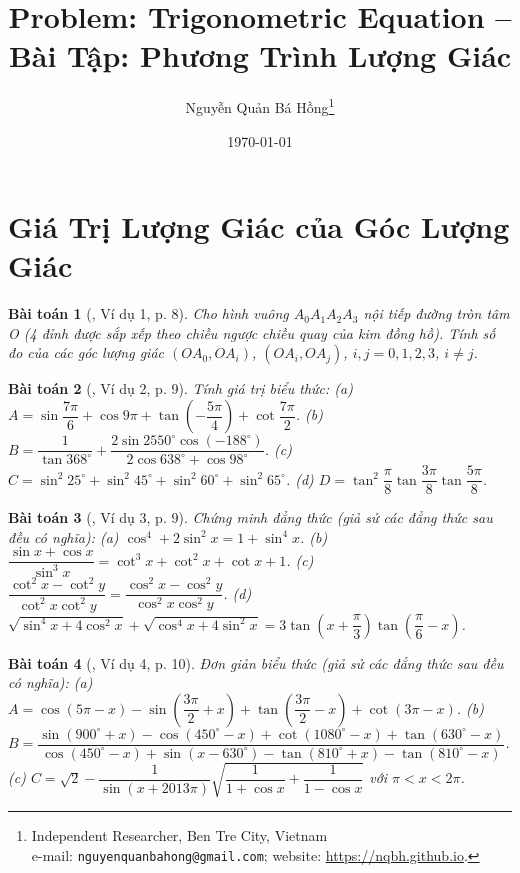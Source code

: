 \documentclass{article}
\title{Problem: Trigonometric Equation -- Bài Tập: Phương Trình Lượng Giác}
\author{Nguyễn Quản Bá Hồng\footnote{Independent Researcher, Ben Tre City, Vietnam\\e-mail: \texttt{nguyenquanbahong@gmail.com}; website: \url{https://nqbh.github.io}.}}
\date{\today}
\newtheorem{baitoan}{Bài toán}
\begin{document}
\maketitle
\tableofcontents


\section{Giá Trị Lượng Giác của Góc Lượng Giác}

\begin{baitoan}[\cite{Hung_nang_cao_phat_trien_Toan_11_tap_1}, Ví dụ 1, p. 8]
	Cho hình vuông $A_0A_1A_2A_3$ nội tiếp đường  tròn tâm O (4 đỉnh được sắp xếp theo chiều ngược chiều quay của kim đồng hồ). Tính số đo của các góc lượng giác $(OA_0,OA_i)$, $(OA_i,OA_j)$, $i,j = 0,1,2,3$, $i\ne j$.
\end{baitoan}

\begin{baitoan}[\cite{Hung_nang_cao_phat_trien_Toan_11_tap_1}, Ví dụ 2, p. 9]
	Tính giá trị biểu thức: (a) $A = \sin\dfrac{7\pi}{6} + \cos9\pi + \tan\left(-\dfrac{5\pi}{4}\right) + \cot\dfrac{7\pi}{2}$. (b) $B = \dfrac{1}{\tan368^\circ} + \dfrac{2\sin2550^\circ\cos(-188^\circ)}{2\cos638^\circ + \cos98^\circ}$. (c) $C = \sin^2 25^\circ + \sin^2 45^\circ + \sin^2 60^\circ + \sin^2 65^\circ$. (d) $D = \tan^2\dfrac{\pi}{8}\tan\dfrac{3\pi}{8}\tan\dfrac{5\pi}{8}$.
\end{baitoan}

\begin{baitoan}[\cite{Hung_nang_cao_phat_trien_Toan_11_tap_1}, Ví dụ 3, p. 9]
	Chứng minh đẳng thức (giả sử các đẳng thức sau đều có nghĩa): (a) $\cos^4 + 2\sin^2x = 1 + \sin^4x$. (b) $\dfrac{\sin x + \cos x}{\sin^3x} = \cot^3x + \cot^2x + \cot x + 1$. (c) $\dfrac{\cot^2x - \cot^2y}{\cot^2x\cot^2y} = \dfrac{\cos^2x - \cos^2y}{\cos^2x\cos^2y}$. (d) $\sqrt{\sin^4x + 4\cos^2x} + \sqrt{\cos^4x + 4\sin^2x} = 3\tan\left(x + \dfrac{\pi}{3}\right)\tan\left(\dfrac{\pi}{6} - x\right)$.
\end{baitoan}

\begin{baitoan}[\cite{Hung_nang_cao_phat_trien_Toan_11_tap_1}, Ví dụ 4, p. 10]
	Đơn giản biểu thức (giả sử các đẳng thức sau đều có nghĩa): (a) $A = \cos(5\pi - x) - \sin\left(\dfrac{3\pi}{2} + x\right) + \tan\left(\dfrac{3\pi}{2} - x\right) + \cot(3\pi - x)$. (b) $B = \dfrac{\sin(900^\circ + x) - \cos(450^\circ - x) + \cot(1080^\circ - x) + \tan(630^\circ - x)}{\cos(450^\circ - x) + \sin(x - 630^\circ) - \tan(810^\circ + x) - \tan(810^\circ - x)}$. (c) $C = \sqrt{2} - \dfrac{1}{\sin(x + 2013\pi)}\sqrt{\dfrac{1}{1 + \cos x} + \dfrac{1}{1 - \cos x}}$ với $\pi < x < 2\pi$.
\end{baitoan}
\end{document}
